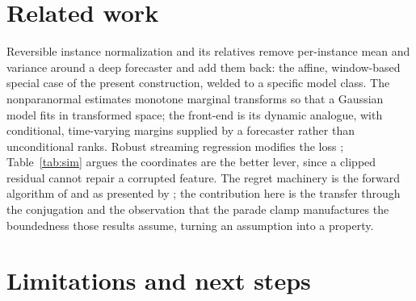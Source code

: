 \documentclass[article]{jss}
\theoremstyle{remark}
\begin{document}
\section{Related work} \label{sec:related}

Reversible instance normalization and its relatives
\citep{kim2021reversible,passalis2019dain} remove per-instance mean and
variance around a deep forecaster and add them back: the affine,
window-based special case of the present construction, welded to a specific
model class. The nonparanormal \citep{liu2009nonparanormal} estimates
monotone marginal transforms so that a Gaussian model fits in transformed
space; the front-end is its dynamic analogue, with conditional, time-varying
margins supplied by a forecaster rather than unconditional ranks. Robust
streaming regression modifies the loss \citep{huber1964}; Table~\ref{tab:sim}
argues the coordinates are the better lever, since a clipped residual cannot
repair a corrupted feature. The regret machinery is the forward algorithm of
\citet{vovk2001} and \citet{azoury2001} as presented by
\citet{cesabianchi2006}; the contribution here is the transfer through the
conjugation and the observation that the parade clamp manufactures the
boundedness those results assume, turning an assumption into a property.

\section{Limitations and next steps} \label{sec:limits}
\end{document}
